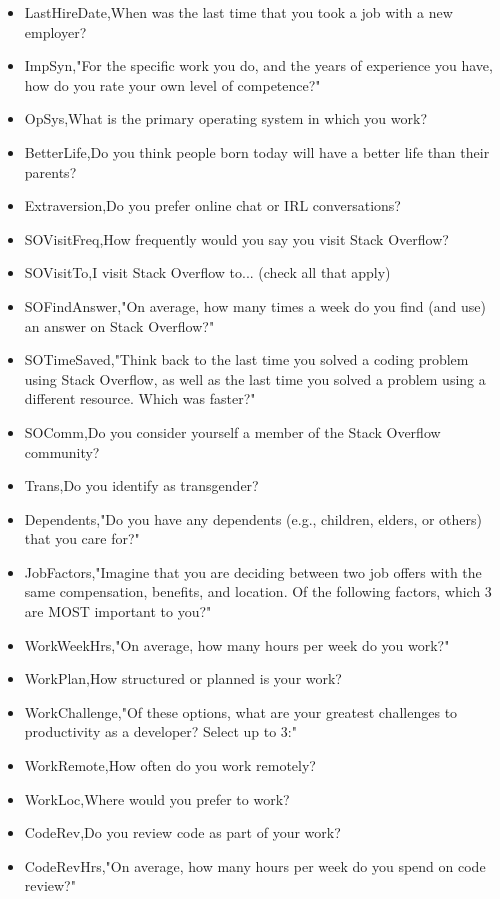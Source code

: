 \begin{appendices}
\begin{itemize}
        \item LastHireDate,When was the last time that you took a job with a new employer?
        \item ImpSyn,"For the specific work you do, and the years of experience you have, how do you rate your own level of competence?"
        \item OpSys,What is the primary operating system in which you work?
        \item BetterLife,Do you think people born today will have a better life than their parents?
        \item Extraversion,Do you prefer online chat or IRL conversations?
        \item SOVisitFreq,How frequently would you say you visit Stack Overflow?
        \item SOVisitTo,I visit Stack Overflow to... (check all that apply)
        \item SOFindAnswer,"On average, how many times a week do you find (and use) an answer on Stack Overflow?"
        \item SOTimeSaved,"Think back to the last time you solved a coding problem using Stack Overflow, as well as the last time you solved a problem using a different resource. Which was faster?"
        \item SOComm,Do you consider yourself a member of the Stack Overflow community?
        \item Trans,Do you identify as transgender?
        \item Dependents,"Do you have any dependents (e.g., children, elders, or others) that you care for?"
        \item JobFactors,"Imagine that you are deciding between two job offers with the same compensation, benefits, and location. Of the following factors, which 3 are MOST important to you?"
        \item WorkWeekHrs,"On average, how many hours per week do you work?"
        \item WorkPlan,How structured or planned is your work?
        \item WorkChallenge,"Of these options, what are your greatest challenges to productivity as a developer? Select up to 3:"
        \item WorkRemote,How often do you work remotely?
        \item WorkLoc,Where would you prefer to work?
        \item CodeRev,Do you review code as part of your work?
        \item CodeRevHrs,"On average, how many hours per week do you spend on code review?"

\end{itemize}
\end{appendices}

